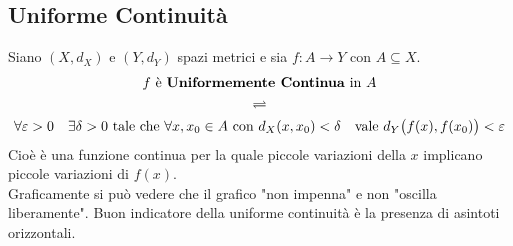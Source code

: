 \subsection{Uniforme Continuità}
\begin{definition}
	\label{def:funz_unif_cont}
	Siano $(X,d_X)$ e $(Y,d_Y)$ spazi metrici e sia $f:A \to Y$ con $A \subseteq X$.
	\begin{equation*}
		\begin{gathered}
			f \text{ è \textbf{Uniformemente Continua} in } A\\
			\rightleftharpoons\\
			\forall \varepsilon > 0 \quad \exists \delta > 0 \text{ tale che } \forall x,x_0 \in A \text{ con } d_X(x,x_0) < \delta \quad \text{vale } d_Y\bigl(f(x),f(x_0)\bigr) < \varepsilon
		\end{gathered}
	\end{equation*}
	Cioè è una funzione continua per la quale piccole variazioni della $x$ implicano piccole variazioni di $f(x)$.\\
	Graficamente si può vedere che il grafico "non impenna" e non "oscilla liberamente". Buon indicatore della uniforme continuità è la presenza di asintoti orizzontali.
\end{definition}
